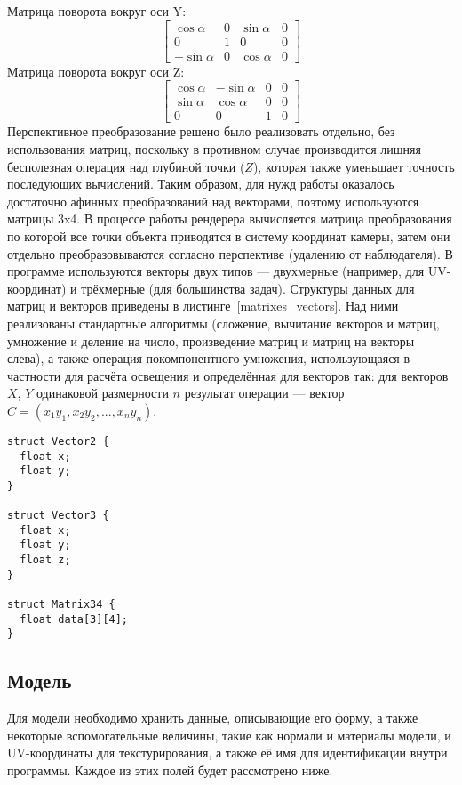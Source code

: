 \documentclass[a4paper,12pt]{report}
\numberwithin{equation}{section}
\begin{document}
Матрица поворота вокруг оси Y:
\begin{equation}
\begin{bmatrix}
\cos{\alpha} & 0 & \sin{\alpha} & 0 \\
0 & 1 & 0 & 0 \\
- \sin{\alpha} & 0 & \cos{\alpha} & 0
\end{bmatrix}
\end{equation}
Матрица поворота вокруг оси Z:
\begin{equation}
\begin{bmatrix}
\cos{\alpha} & -\sin{\alpha} & 0 & 0 \\
\sin{\alpha} & \cos{\alpha} & 0 & 0 \\
0 & 0 & 1 & 0
\end{bmatrix}
\end{equation}
Перспективное преобразование решено было реализовать отдельно, без использования матриц, поскольку в противном случае производится лишняя бесполезная операция над глубиной точки ($Z$), которая также уменьшает точность последующих вычислений. Таким образом, для нужд работы оказалось достаточно афинных преобразований над векторами, поэтому используются матрицы 3x4. В процессе работы рендерера вычисляется матрица преобразования по которой все точки объекта приводятся в систему координат камеры, затем они отдельно преобразовываются согласно перспективе (удалению от наблюдателя). В программе используются векторы двух типов --- двухмерные (например, для UV-координат) и трёхмерные (для большинства задач). Структуры данных для матриц и векторов приведены в листинге~\ref{matrixes_vectors}. Над ними реализованы стандартные алгоритмы (сложение, вычитание векторов и матриц, умножение и деление на число, произведение матриц и матриц на векторы слева), а также операция покомпонентного умножения, использующаяся в частности для расчёта освещения и определённая для векторов так: для векторов $X$, $Y$ одинаковой размерности $n$ результат операции --- вектор $C = (x_1 y_1, x_2 y_2, ..., x_n y_n)$.

\begin{lstlisting}[float=h,caption={Структуры данных ``Вектор'' и ``Матрица''},label=matrixes_vectors]
struct Vector2 {
  float x;
  float y;
}

struct Vector3 {
  float x;
  float y;
  float z;
}

struct Matrix34 {
  float data[3][4];
}
\end{lstlisting}

\subsection{Модель}
Для модели необходимо хранить данные, описывающие его форму, а также некоторые вспомогательные величины, такие как нормали и материалы модели, и UV-координаты для текстурирования, а также её имя для идентификации внутри программы. Каждое из этих полей будет рассмотрено ниже.
\end{document}
